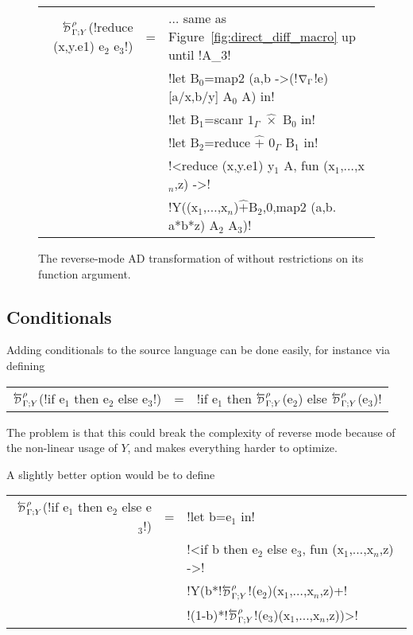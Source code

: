 \begin{figure}

\begin{small}
\begin{tabular}{|r c l|}
\hline
$\directD{\rho}{\Gamma}{Y}$(!reduce (x,y.e1) e$_2$ e$_3$!) 
&=& $\ldots$ same as Figure~\ref{fig:direct_diff_macro} up until !A_$3$! \\
&& !let B$_0$=map2 (a,b ->(!$\nabla_\Gamma$!e)[a/x,b/y] A$_0$ A) in!\\
&& !let B$_1$=scanr $1_\Gamma$ $\widehat{\times}$ B$_0$ in! \\
&& !let B$_2$=reduce $\widehat{+}$ $0_\Gamma$ B$_1$ in! \\
&& !<reduce (x,y.e1) y$_1$ A, fun (x$_1$,$\ldots$,x$_n$,z) ->! \\
&& !Y((x$_1$,$\ldots$,x$_n$)$\widehat{+}$B$_2$,0,map2 (a,b. a*b*z) A$_2$ A$_3$)! \\ \hline
\end{tabular}
\end{small}
\caption{The reverse-mode AD transformation of  without restrictions on its function argument.}
\label{fig:lift_reduce}
\end{figure}

\subsection{Conditionals} %
\label{sub:lift_conditional}

Adding conditionals to the source language can be done easily, for instance via defining

\begin{tabular}{r c l}
$\directD{\rho}{\Gamma}{Y}$(!if e$_1$ then e$_2$ else e$_3$!) &=& !if e$_1$ then $\directD{\rho}{\Gamma}{Y}$(e$_2$) else $\directD{\rho}{\Gamma}{Y}$(e$_3$)! 
\end{tabular}

The problem is that this could break the complexity of reverse mode because of the non-linear usage of $Y$, and makes everything harder to optimize.

A slightly better option would be to define 

\begin{tabular}{r c l}
    $\directD{\rho}{\Gamma}{Y}$(!if e$_1$ then e$_2$ else e$_3$!) 
    &=& !let b=e$_1$ in!   \\
    && !<if b then e$_2$ else e$_3$, fun (x$_1$,$\ldots$,x$_n$,z) ->! \\
    && !Y(b*!$\directD{\rho}{\Gamma}{Y}$!(e$_2$)(x$_1$,$\ldots$,x$_n$,z)+!\\
    && \quad!(1-b)*!$\directD{\rho}{\Gamma}{Y}$!(e$_3$)(x$_1$,$\ldots$,x$_n$,z))>!
\end{tabular}

